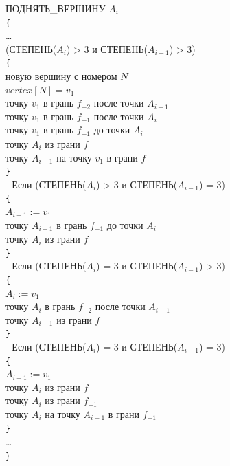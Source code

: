 \documentclass[a4paper,12pt, titlepage]{article}
\begin{document}
\begin{flushleft}
 ПОДНЯТЬ\_ВЕРШИНУ $A_{i}$\\
\verb"{"\\
\quad\ldots\\

 (СТЕПЕНЬ($A_{i}$) > 3 и СТЕПЕНЬ($A_{i - 1}$) > 3)\\
\quad\verb"{"\\
\quad{} новую вершину с номером $N$\\
\quad\quad$vertex[N] = v_{1}$\\
\quad{} точку $v_{1}$ в грань $f_{-2}$ после точки $A_{i - 1}$\\
\quad{} точку $v_{1}$ в грань $f_{-1}$ после точки $A_{i}$\\
\quad{} точку $v_{1}$ в грань $f_{+1}$ до точки $A_{i}$\\
\quad{} точку $A_{i}$ из грани $f$\\
\quad{} точку $A_{i - 1}$ на точку $v_{1}$ в грани $f$\\
\quad\verb"}"\\

 - Если (СТЕПЕНЬ($A_{i}$) > 3 и СТЕПЕНЬ($A_{i - 1}$) = 3)\\
\quad\verb"{"\\
\quad\quad$A_{i - 1} := v_{1}$\\
\quad{} точку $A_{i - 1}$ в грань $f_{+1}$ до точки $A_{i}$\\
\quad{} точку $A_{i}$ из грани $f$\\
\quad\verb"}"\\

 - Если (СТЕПЕНЬ($A_{i}$) = 3 и СТЕПЕНЬ($A_{i - 1}$) > 3)\\
\quad\verb"{"\\
\quad\quad$A_{i} := v_{1}$\\
\quad{} точку $A_{i}$ в грань $f_{-2}$ после точки $A_{i - 1}$\\
\quad{} точку $A_{i - 1}$ из грани $f$\\
\quad\verb"}"\\

 - Если (СТЕПЕНЬ($A_{i}$) = 3 и СТЕПЕНЬ($A_{i - 1}$) = 3)\\
\quad\verb"{"\\
\quad\quad$A_{i - 1} := v_{1}$\\
\quad{} точку $A_{i}$ из грани $f$\\
\quad{} точку $A_{i}$ из грани $f_{-1}$\\
\quad{} точку $A_{i}$ на точку $A_{i - 1}$ в грани $f_{+1}$\\
\quad\verb"}"\\

\quad\ldots\\
\verb"}"\\

\end{flushleft}
\end{document}
